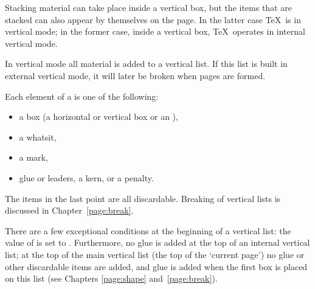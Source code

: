 \documentclass[twoside,letterpaper,openright]{rapport3}
\begin{document}
Stacking material can take place inside a 
vertical box, but the
items that are stacked can also 
appear by themselves on the page. In the latter case
\TeX\ is in vertical mode; in the former case, inside a
vertical box, \TeX\ operates in internal vertical mode.

In vertical mode all material is added to a vertical list.
If this list is built in external vertical mode, it
will later be broken when pages are formed.

Each element of a  is one of the following:
\begin{itemize}
\item a box (a horizontal or vertical box or an ),
\item a whatsit,
\item a mark,
\item glue or leaders, a kern, or a penalty.
\end{itemize}
The items in the last point are all discardable.
Breaking of vertical lists
is discussed in Chapter~\ref{page:break}.

There are a few exceptional conditions at the beginning
of  a vertical list: the value of  is set
to \n{-1000pt}. Furthermore, no  glue is added
at the top of an internal vertical list; 
at the top of the main vertical list (the top of the
`current page') no glue or other discardable items
are added, and  glue is added when the
first box is placed on this list
(see Chapters \ref{page:shape} and~\ref{page:break}).
\end{document}

